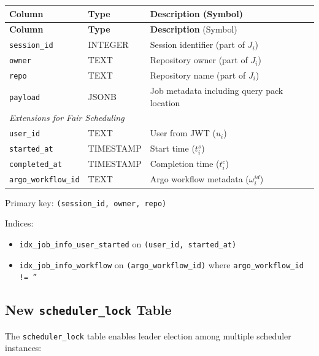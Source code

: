 \documentclass[11pt]{article}
\begin{document}
\begin{center}
\begin{longtable}{p{4.5cm}p{2.5cm}p{7cm}}
\toprule
\textbf{Column} & \textbf{Type} & \textbf{Description} (Symbol) \\
\midrule
\endfirsthead

\toprule
\textbf{Column} & \textbf{Type} & \textbf{Description} (Symbol) \\
\midrule
\endhead

\midrule
\endfoot

\bottomrule
\endlastfoot

\texttt{session\_id} & INTEGER & Session identifier (part of $J_i$) \\
\texttt{owner} & TEXT & Repository owner (part of $J_i$) \\
\texttt{repo} & TEXT & Repository name (part of $J_i$) \\
\texttt{payload} & JSONB & Job metadata including query pack location \\
\hline
\multicolumn{3}{l}{\textit{Extensions for Fair Scheduling}} \\
\texttt{user\_id} & TEXT & User from JWT ($u_i$) \\
\texttt{started\_at} & TIMESTAMP & Start time ($t_i^s$) \\
\texttt{completed\_at} & TIMESTAMP & Completion time ($t_i^c$) \\
\texttt{argo\_workflow\_id} & TEXT & Argo workflow metadata ($\omega_i^{id}$) \\
\end{longtable}
\end{center}

Primary key: \texttt{(session\_id, owner, repo)}

Indices:
\begin{itemize}
\item \texttt{idx\_job\_info\_user\_started} on \texttt{(user\_id, started\_at)}
\item \texttt{idx\_job\_info\_workflow} on \texttt{(argo\_workflow\_id)} where \texttt{argo\_workflow\_id != ''}
\end{itemize}

\subsection{New \texttt{scheduler\_lock} Table}

The \texttt{scheduler\_lock} table enables leader election among multiple scheduler instances:
\end{document}
